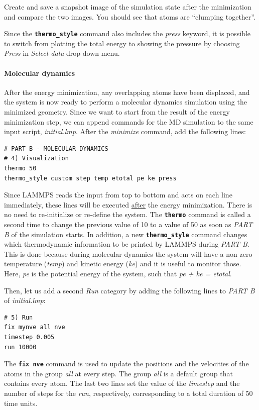 \documentclass[9pt,tutorial]{livecoms}
\renewcommand{\emph}[1]{\underline{#1}}
\newcommand{\lmpcmd}[1]{\texttt{\normalsize\bfseries\textcolor{command}{#1}}}
\begin{document}
Create and save a snapshot image of the simulation state after the
minimization and compare the two images.  You should see that atoms
are ``clumping together''.

Since the \lmpcmd{thermo\_style} command also includes the \textit{press}
keyword, it is possible to switch from plotting the total energy to
showing the pressure by choosing \textit{Press} in \textit{Select data}
drop down menu.

\paragraph{Molecular dynamics}

After the energy minimization, any overlapping atoms have been
displaced, and the system is now ready to perform a molecular dynamics
simulation using the minimized geometry.  Since we want to start from
the result of the energy minimization step, we can append commands for
the MD simulation to the same input script, \textit{initial.lmp}. After
the \textit{minimize} command, add the following lines:
\begin{lstlisting}
# PART B - MOLECULAR DYNAMICS
# 4) Visualization
thermo 50
thermo_style custom step temp etotal pe ke press
\end{lstlisting}

Since LAMMPS reads the input from top to bottom and acts on each line
immediately, these lines will be executed \emph{after} the energy
minimization.  There is no need to re-initialize or re-define the
system.  The \lmpcmd{thermo} command is called a second time to change
the previous value of 10 to a value of 50 as soon as \textit{PART B} of
the simulation starts.  In addition, a new \lmpcmd{thermo\_style}
command changes which thermodynamic information to be printed by LAMMPS
during \textit{PART B}.  This is done because during molecular
dynamics the system will have a non-zero temperature (\textit{temp})
and kinetic energy (\textit{ke}) and it is useful to monitor those.
Here, \textit{pe} is the potential energy of the system, such that
\textit{pe + ke = etotal}.

Then, let us add a second \textit{Run} category by adding the following
lines to \textit{PART B} of \textit{initial.lmp}:
\begin{lstlisting}
# 5) Run
fix mynve all nve
timestep 0.005
run 10000
\end{lstlisting}
The \lmpcmd{fix nve} command is used to update the positions and the
velocities of the atoms in the group \textit{all} at every step.  The
group \textit{all} is a default group that contains every atom.  The
last two lines set the value of the \textit{timestep} and the number of
steps for the \textit{run}, respectively, corresponding to a total
duration of 50 time units.
\end{document}
